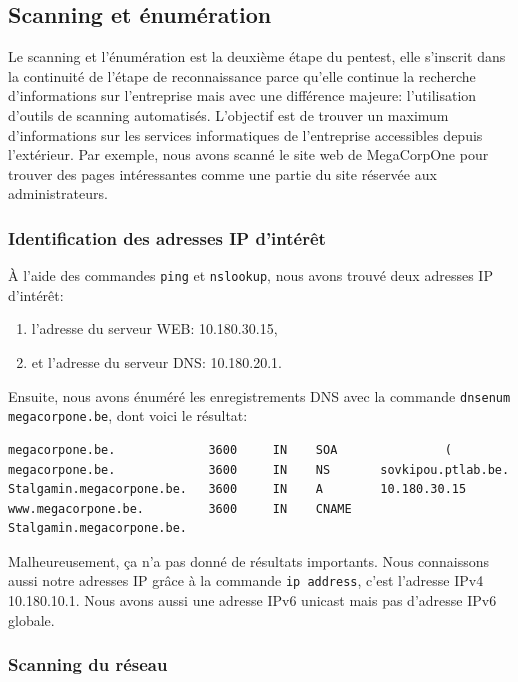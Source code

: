\documentclass[french,paper=a4,oneside,captions=tableheading]{article}
\begin{document}
\subsection{Scanning et énumération}

Le scanning et l'énumération est la deuxième étape du pentest, elle s'inscrit dans la continuité de l'étape de reconnaissance parce qu'elle continue la recherche d'informations sur l'entreprise mais avec une différence majeure: l'utilisation d'outils de scanning automatisés. L'objectif est de trouver un maximum d'informations sur les services informatiques de l'entreprise accessibles depuis l'extérieur. Par exemple, nous avons scanné le site web de MegaCorpOne pour trouver des pages intéressantes comme une partie du site réservée aux administrateurs.



\subsubsection{Identification des adresses IP d'intérêt}

À l'aide des commandes \texttt{ping} et \texttt{nslookup}, nous avons trouvé deux adresses IP d'intérêt:
\begin{enumerate}
    \item l'adresse du serveur WEB: 10.180.30.15,
    \item et l'adresse du serveur DNS: 10.180.20.1.
\end{enumerate}

Ensuite, nous avons énuméré les enregistrements DNS avec la commande \texttt{dnsenum megacorpone.be}, dont voici le résultat:
\begin{example}
\begin{Verbatim}
megacorpone.be.             3600     IN    SOA               (
megacorpone.be.             3600     IN    NS       sovkipou.ptlab.be.
Stalgamin.megacorpone.be.   3600     IN    A        10.180.30.15
www.megacorpone.be.         3600     IN    CNAME    Stalgamin.megacorpone.be.
\end{Verbatim}
\end{example}

Malheureusement, ça n'a pas donné de résultats importants. Nous connaissons aussi notre adresses IP grâce à la commande \texttt{ip address}, c'est l'adresse IPv4 10.180.10.1. Nous avons aussi une adresse IPv6 unicast mais pas d'adresse IPv6 globale.



\subsubsection{Scanning du réseau}
\end{document}
